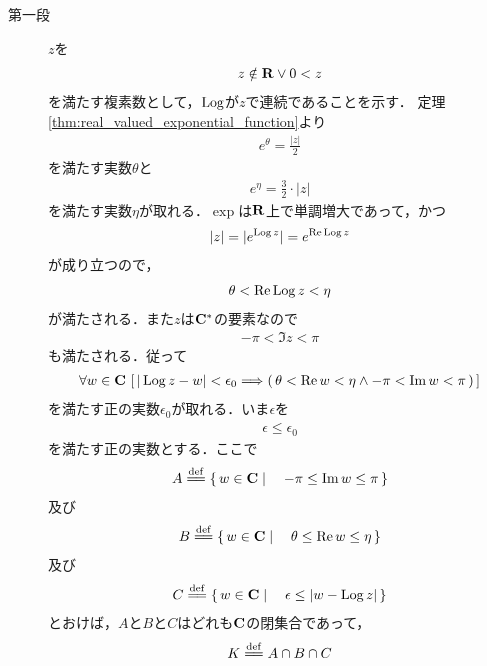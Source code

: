 	\begin{sketch}\mbox{}
		\begin{description}
			\item[第一段]
				$z$を
				\begin{align}
					z \notin \mathbf{R} \vee 0 < z
				\end{align}
				を満たす複素数として，$\operatorname{Log}$が$z$で連続であることを示す．
				定理\ref{thm:real_valued_exponential_function}より
				\begin{align}
					e^{\theta} = \frac{|z|}{2}
				\end{align}
				を満たす実数$\theta$と
				\begin{align}
					e^{\eta} = \frac{3}{2} \cdot |z|
				\end{align}
				を満たす実数$\eta$が取れる．$\exp$は$\mathbf{R}$上で単調増大であって，かつ
				\begin{align}
					|z| = |e^{\operatorname{Log}{z}}| = e^{\operatorname{Re} \operatorname{Log}{z}}
				\end{align}
				が成り立つので，
				\begin{align}
					\theta < \operatorname{Re} \operatorname{Log}{z} < \eta
				\end{align}
				が満たされる．また$z$は$\mathbf{C}^*$の要素なので
				\begin{align}
					-\pi < \Im{z} < \pi
				\end{align}
				も満たされる．従って
				\begin{align}
					\forall w \in \mathbf{C}\,
					\left[\, |\operatorname{Log}{z} - w| < \epsilon_0
					\Longrightarrow \left(\, \theta < \operatorname{Re} w < \eta
					\wedge -\pi < \operatorname{Im} w < \pi\, \right)\, \right]
				\end{align}
				を満たす正の実数$\epsilon_0$が取れる．いま$\epsilon$を
				\begin{align}
					\epsilon \leq \epsilon_0
				\end{align}
				を満たす正の実数とする．ここで
				\begin{align}
					A \defeq \Set{w \in \C}{-\pi \leq \Im{w} \leq \pi}
				\end{align}
				及び
				\begin{align}
					B \defeq \Set{w \in \C}{\theta \leq \Re{w} \leq \eta}
				\end{align}
				及び
				\begin{align}
					C \defeq \Set{w \in \C}{\epsilon \leq |w - \pvlog{z}|}
				\end{align}
				とおけば，$A$と$B$と$C$はどれも$\mathbf{C}$の閉集合であって，
				\begin{align}
					K \defeq A \cap B \cap C
				\end{align}

\end{description}
\end{sketch}
